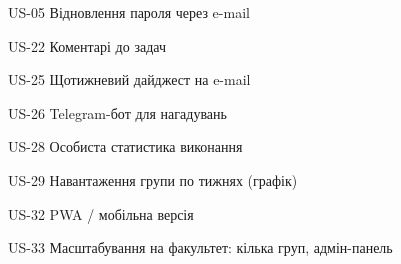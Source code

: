 \item US-05 Відновлення пароля через e-mail
\item US-22 Коментарі до задач
\item US-25 Щотижневий дайджест на e-mail
\item US-26 Telegram-бот для нагадувань
\item US-28 Особиста статистика виконання
\item US-29 Навантаження групи по тижнях (графік)
\item US-32 PWA / мобільна версія
\item US-33 Масштабування на факультет: кілька груп, адмін-панель